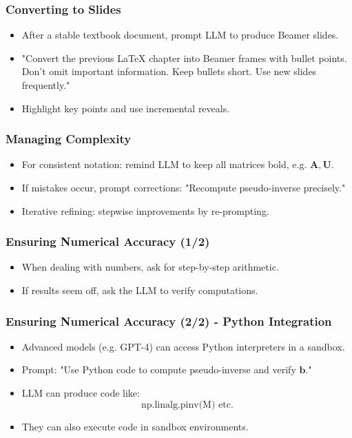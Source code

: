\documentclass[aspectratio=169]{beamer}
\begin{document}
\begin{frame}
\frametitle{Converting to Slides}
\begin{itemize}[<+->]
\item After a stable textbook document, prompt LLM to produce Beamer slides.
\item "Convert the previous LaTeX chapter into Beamer frames with bullet points. Don't omit important information. Keep bullets short. Use new slides frequently."
\item Highlight key points and use incremental reveals.
\end{itemize}
\end{frame}

\begin{frame}
\frametitle{Managing Complexity}
\begin{itemize}[<+->]
\item For consistent notation: remind LLM to keep all matrices bold, e.g. $\mathbf{A}, \mathbf{U}$.
\item If mistakes occur, prompt corrections: "Recompute pseudo-inverse precisely."
\item Iterative refining: stepwise improvements by re-prompting.
\end{itemize}
\end{frame}

\begin{frame}
\frametitle{Ensuring Numerical Accuracy (1/2)}
\begin{itemize}[<+->]
\item When dealing with numbers, ask for step-by-step arithmetic.
\item If results seem off, ask the LLM to verify computations.
\end{itemize}
\end{frame}

\begin{frame}
\frametitle{Ensuring Numerical Accuracy (2/2) - Python Integration}
\begin{itemize}[<+->]
\item Advanced models (e.g. GPT-4) can access Python interpreters in a sandbox.
\item Prompt: "Use Python code to compute pseudo-inverse and verify \(\mathbf{b}\)."
\item LLM can produce code like:
\[
\text{np.linalg.pinv(M)} \text{ etc.}
\]
\item They can also execute code in sandbox environments.
\end{itemize}
\end{frame}
\end{document}
